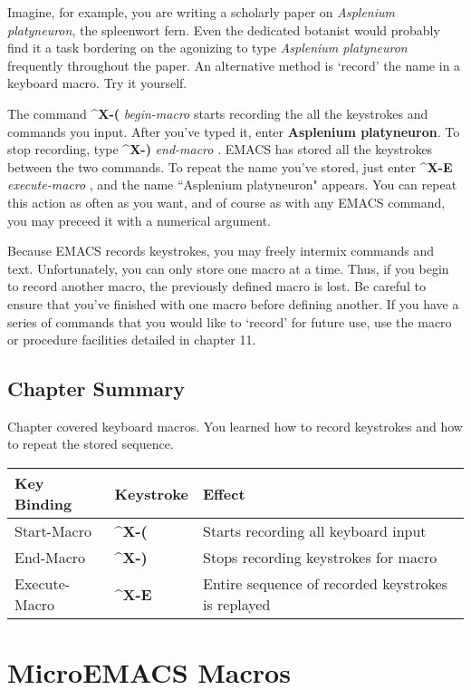 Imagine, for example, you are writing a scholarly paper on {\it{}Asplenium
platyneuron}, the spleenwort fern.  Even the dedicated botanist would
probably find it a task bordering on the agonizing to type
{\it{}Asplenium platyneuron} frequently throughout the paper.  An
alternative method is `record' the name in a keyboard macro.  Try it
yourself.

The command {\bf{}\^{}X-(} {\it{}begin-macro} 
starts recording the all the keystrokes and commands you input.  After
you've typed it, enter {\bf{}Asplenium platyneuron}.  To stop
recording, type {\bf{}\^{}X-)} {\it{}end-macro} .
EMACS has stored all the keystrokes between the two commands.  To
repeat the name you've stored, just enter {\bf{}\^{}X-E}
{\it{}execute-macro} , and the name ``Asplenium
platyneuron" appears.  You can repeat this action as often as you
want, and of course as with any EMACS command, you may preceed it with
a numerical argument.

Because EMACS records keystrokes, you may freely intermix commands and
text.  Unfortunately, you can only store one macro at a time.  Thus, if
you begin to record another macro, the previously defined macro is
lost. Be careful to ensure that you've finished with one macro before
defining another.  If you have a series of commands that you would like
to `record' for future use, use the macro or procedure facilities
detailed in chapter 11.
\section{Chapter \thechapter{} Summary}

Chapter \thechapter{} covered keyboard macros.  You learned how to
record keystrokes and how to repeat the stored sequence.

\begin{tabular}{llp{4in}}
Key Binding & Keystroke & Effect \\ \hline
Start-Macro & {\bf{}\^{}X-(} & Starts recording all keyboard input\\

End-Macro & {\bf{}\^{}X-)} & Stops recording keystrokes for macro\\

Execute-Macro & {\bf{}\^{}X-E} & Entire sequence of recorded
keystrokes is replayed\\

\end{tabular}
\chapter{MicroEMACS Macros}

